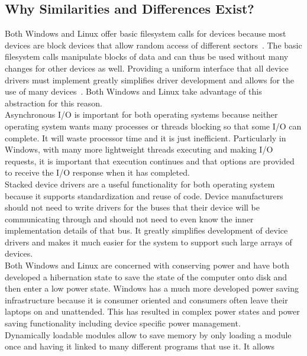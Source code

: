 \documentclass[letterpaper,10pt,titlepage]{article}
\begin{document}
\subsection{Why Similarities and Differences Exist?}
Both Windows and Linux offer basic filesystem calls for devices because most 
devices are block devices that allow random access of different sectors~\cite{love14}. 
The basic filesystem calls manipulate blocks of data and can thus be used 
without many changes for other devices as well. Providing a uniform interface
that all device drivers must implement greatly simplifies driver development
and allows for the use of many devices~\cite{msdn-io}. Both Windows and Linux take advantage
of this abstraction for this reason. 
\\
\linebreak
Asynchronous I/O is important for both operating systems because neither 
operating system wants many processes or threads blocking so that some I/O 
can complete. It will waste processor time and it is just inefficient. 
Particularly in Windows, with many more lightweight threads executing and 
making I/O requests, it is important that execution continues and that 
options are provided to receive the I/O response when it has completed.
\\
\linebreak
Stacked device drivers are a useful functionality for both operating system 
because it supports standardization and reuse of code. Device manufacturers
should not need to write drivers for the buses that their device will be 
communicating through and should not need to even know the inner 
implementation details of that bus. It greatly simplifies development of 
device drivers and makes it much easier for the system to support such large
arrays of devices.
\\
\linebreak
Both Windows and Linux are concerned with conserving power and have both 
developed a hibernation state to save the state of the computer onto disk and
then enter a low power state. Windows has a much more developed power saving
infrastructure because it is consumer oriented and consumers often leave 
their laptops on and unattended. This has resulted in complex power states 
and power saving functionality including device specific power 
management.
\\
\linebreak
Dynamically loadable modules allow to save memory by only loading a module 
once and having it linked to many different programs that use it. It allows
\end{document}
